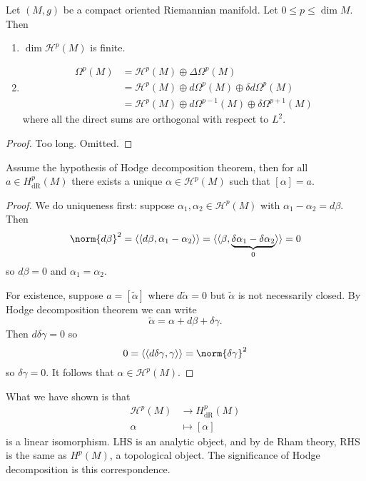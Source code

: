 \documentclass[a4paper]{article}
\begin{document}
\begin{theorem}
  Let \((M, g)\) be a compact oriented Riemannian manifold. Let \(0 \leq p \leq \dim M\). Then
  \begin{enumerate}
  \item \(\dim \mathcal H^p(M)\) is finite.
  \item
    \begin{align*}
      \Omega^p(M)
      &= \mathcal H^p(M) \oplus \Delta \Omega^p(M) \\
      &= \mathcal H^p(M) \oplus d\Omega^p(M) \oplus \delta d\Omega^p(M) \\
      &= \mathcal H^p(M) \oplus d \Omega^{p - 1}(M) \oplus \delta \Omega^{p + 1}(M)
    \end{align*}
    where all the direct sums are orthogonal with respect to \(L^2\).
  \end{enumerate}
\end{theorem}

\begin{proof}
  Too long. Omitted.
\end{proof}

\begin{corollary}
  Assume the hypothesis of Hodge decomposition theorem, then for all \(a \in H_{\text{dR}}^p(M)\) there exists a unique \(\alpha \in \mathcal H^p(M)\) such that \([\alpha] = a\).
\end{corollary}

\begin{proof}
  We do uniqueness first: suppose \(\alpha_1, \alpha_2 \in \mathcal H^p(M)\) with \(\alpha_1 - \alpha_2 = d\beta\). Then
  \[
    \norm{d\beta}^2
    = \langle\langle d\beta, \alpha_1 - \alpha_2 \rangle\rangle
    = \langle\langle \beta, \underbrace{\delta\alpha_1 - \delta\alpha_2}_0 \rangle\rangle
    = 0 
  \]
  so \(d\beta = 0\) and \(\alpha_1 = \alpha_2\).

  For existence, suppose \(a = [\tilde \alpha]\) where \(d \tilde \alpha = 0\) but \(\tilde \alpha\) is not necessarily closed. By Hodge decomposition theorem we can write
  \[
    \tilde \alpha = \alpha + d\beta + \delta \gamma.
  \]
  Then \(d\delta \gamma = 0\) so
  \[
    0
    = \langle\langle d\delta\gamma, \gamma \rangle\rangle
    = \norm{\delta \gamma}^2
  \]
  so \(\delta \gamma = 0\). It follows that \(\alpha \in \mathcal H^p(M)\).
\end{proof}

What we have shown is that
\begin{align*}
  \mathcal H^p(M) &\to H_{\text{dR}}^p(M) \\
  \alpha &\mapsto [\alpha]
\end{align*}
is a linear isomorphism. LHS is an analytic object, and by de Rham theory, RHS is the same as \(H^p(M)\), a topological object. The significance of Hodge decomposition is this correspondence.
\end{document}
